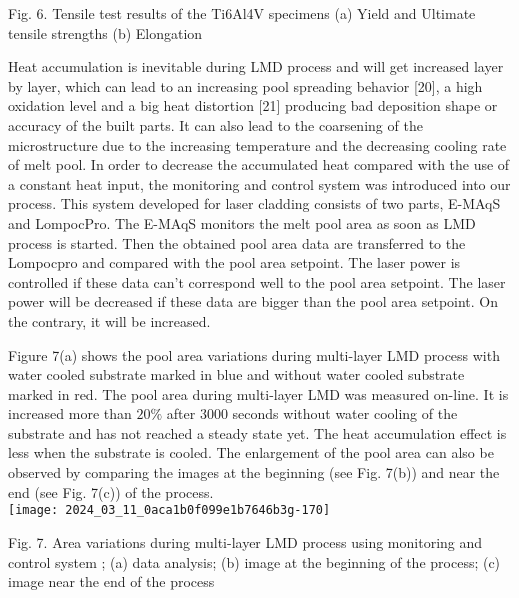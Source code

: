 \documentclass[10pt]{article}
\begin{document}
Fig. 6. Tensile test results of the Ti6Al4V specimens (a) Yield and Ultimate tensile strengths (b) Elongation

Heat accumulation is inevitable during LMD process and will get increased layer by layer, which can lead to an increasing pool spreading behavior [20], a high oxidation level and a big heat distortion [21] producing bad deposition shape or accuracy of the built parts. It can also lead to the coarsening of the microstructure due to the increasing temperature and the decreasing cooling rate of melt pool. In order to decrease the accumulated heat compared with the use of a constant heat input, the monitoring and control system was introduced into our process. This system developed for laser cladding consists of two parts, E-MAqS and LompocPro. The E-MAqS monitors the melt pool area as soon as LMD process is started. Then the obtained pool area data are transferred to the Lompocpro and compared with the pool area setpoint. The laser power is controlled if these data can't correspond well to the pool area setpoint. The laser power will be decreased if these data are bigger than the pool area setpoint. On the contrary, it will be increased.

Figure 7(a) shows the pool area variations during multi-layer LMD process with water cooled substrate marked in blue and without water cooled substrate marked in red. The pool area during multi-layer LMD was measured on-line. It is increased more than $20 \%$ after 3000 seconds without water cooling of the substrate and has not reached a steady state yet. The heat accumulation effect is less when the substrate is cooled. The enlargement of the pool area can also be observed by comparing the images at the beginning (see Fig. 7(b)) and near the end (see Fig. 7(c)) of the process.\\
\texttt{[image: 2024\_03\_11\_0aca1b0f099e1b7646b3g-170]}

Fig. 7. Area variations during multi-layer LMD process using monitoring and control system ; (a) data analysis; (b) image at the beginning of the process; (c) image near the end of the process
\end{document}
